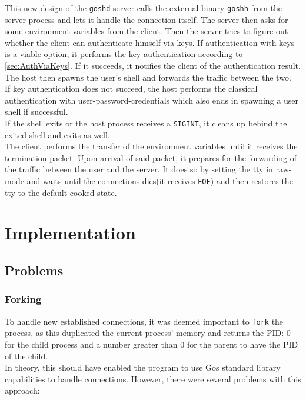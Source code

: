 \documentclass[10pt,a4paper,titlepage,twoside,english,final]{zhawreprt}
\begin{document}
This new design of the \texttt{goshd} server calls the external binary \texttt{goshh} from the server process and lets it handle the connection itself. The server then asks for some environment variables from the client. Then the server tries to figure out whether the client can authenticate himself via keys. If authentication with keys is a viable option, it performs the key authentication according to \ref{sec:AuthViaKeys}. If it succeeds, it notifies the client of the authentication result. The host then spawns the user's \gls{shell} and forwards the traffic between the two.\\
If key authentication does not succeed, the host performs the classical authentication with user-password-credentials which also ends in spawning a user \gls{shell} if successful.\\
If the \gls{shell} exits or the host process receives a \texttt{SIGINT}, it cleans up behind the exited \gls{shell} and exits as well.\\
The client performs the transfer of the environment variables until it receives the termination packet. Upon arrival of said packet, it prepares for the forwarding of the traffic between the user and the server. It does so by setting the \gls{tty} in raw-mode and waits until the connections dies(it receives \texttt{EOF}) and then restores the \gls{tty} to the default cooked state.


\chapter{Implementation}\label{chp:Implementation}
\section{Problems}\label{sec:Problems}
\subsection{Forking}\label{ssec:Forking}
To handle new established connections, it was deemed important to \texttt{fork} the process, as this duplicated the current process' memory and returns the \gls{PID}: 0 for the child process and a number greater than 0 for the parent to have the \gls{PID} of the child.\\
In theory, this should have enabled the program to use \gls{Go}s standard library capabilities to handle connections. However, there were several problems with this approach:
\end{document}
